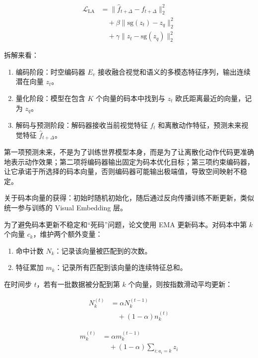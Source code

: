 \[
\begin{aligned}
\mathcal{L}_{\mathrm{LA}}
&=
\lVert \hat{f}_{t+\Delta} - f_{t+\Delta} \rVert_2^2
\\
&\quad+ \beta \lVert \mathrm{sg}(z_t) - z_q \rVert_2^2
\\
&\quad+ \gamma \lVert z_t - \mathrm{sg}(z_q) \rVert_2^2
\end{aligned}
\]

拆解来看：

\begin{enumerate}
\def\labelenumi{\arabic{enumi}.}
\tightlist
\item
  编码阶段：时空编码器 \(E_v\) 接收融合视觉和语义的多模态特征序列，输出连续潜在向量 \(z_t\)。
\item
  量化阶段：模型在包含 \(K\) 个向量的码本中找到与 \(z_t\) 欧氏距离最近的向量，记为 \(z_q\)。
\item
  解码与预测阶段：解码器接收当前视觉特征 \(f_t\) 和离散动作特征，预测未来视觉特征 \(\hat{f}_{t+\Delta}\)。
\end{enumerate}

第一项预测未来，不是为了训练世界模型本身，而是为了让离散化动作代码更准确地表示动作效果；第二项将编码器输出固定为码本优化目标；第三项约束编码器，让它承诺于所选择的码本向量，否则编码器可能输出极端值，导致空间映射不稳定。

关于码本向量的获得：初始时随机初始化，随后通过反向传播训练不断更新，类似统一参与训练的 Visual Embedding 层。

为了避免码本更新不稳定和``死码''问题，论文使用 EMA 更新码本。对码本中第 \(k\) 个向量 \(c_k\)，维护两个额外变量：

\begin{enumerate}
\def\labelenumi{\arabic{enumi}.}
\tightlist
\item
  命中计数 \(N_k\)：记录该向量被匹配到的次数。
\item
  特征累加 \(m_k\)：记录所有匹配到该向量的连续特征总和。
\end{enumerate}

在时间步 \(t\)，若有一批数据被分配到第 \(k\) 个向量，则按指数滑动平均更新：

\[
\begin{aligned}
N_k^{(t)}
&= \alpha N_k^{(t-1)}
\\
&\quad + (1-\alpha)n_k^{(t)}
\end{aligned}
\]

\[
\begin{aligned}
m_k^{(t)}
&= \alpha m_k^{(t-1)}
\\
&\quad + (1-\alpha)\sum_{i:a_i=k} z_i
\end{aligned}
\]


